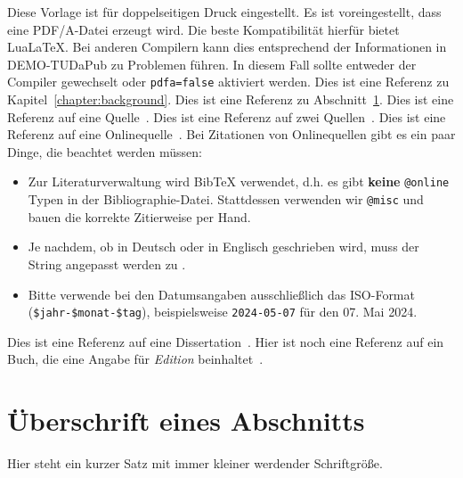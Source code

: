 Diese Vorlage ist für doppelseitigen Druck eingestellt.
Es ist voreingestellt, dass eine PDF/A-Datei erzeugt wird.
Die beste Kompatibilität hierfür bietet Lua\LaTeX.
Bei anderen Compilern kann dies entsprechend der Informationen in DEMO-TUDaPub zu Problemen führen.
In diesem Fall sollte entweder der Compiler gewechselt oder \texttt{pdfa=false} aktiviert werden.
Dies ist eine Referenz zu Kapitel~\ref{chapter:background}.
Dies ist eine Referenz zu Abschnitt~\ref{sect:dummy-section}.
Dies ist eine Referenz auf eine Quelle~\cite{Luthmann2017}.
Dies ist eine Referenz auf zwei Quellen~\cite{Luthmann2019,Ruland2018}.
Dies ist eine Referenz auf eine Onlinequelle~\cite{parallel-computing}.
Bei Zitationen von Onlinequellen gibt es ein paar Dinge, die beachtet werden müssen:
\begin{itemize}
	\item Zur Literaturverwaltung wird BibTeX verwendet, d.h. es gibt \textbf{keine} \texttt{@online} Typen in der Bibliographie-Datei. Stattdessen verwenden wir \texttt{@misc} und bauen die korrekte Zitierweise per Hand.
	\item Je nachdem, ob in Deutsch oder in Englisch geschrieben wird, muss der String  angepasst werden zu .
	\item Bitte verwende bei den Datumsangaben ausschließlich das ISO-Format (\texttt{\$jahr-\$monat-\$tag}), beispielsweise \texttt{2024-05-07} für den 07. Mai 2024.
\end{itemize}
Dies ist eine Referenz auf eine Dissertation~\cite{tomaszek_stefan_modellbasierte_2021}.
Hier ist noch eine Referenz auf ein Buch, die eine Angabe für \textit{Edition} beinhaltet~\cite{gtTaentzer}.



\section{Überschrift eines Abschnitts}\label{sect:dummy-section}


{\Huge Hier} {\huge steht} {\LARGE ein} {\Large kurzer} {\large Satz} {\normalsize mit} {\small immer} {\footnotesize kleiner} {\scriptsize werdender} {\tiny Schriftgröße}.